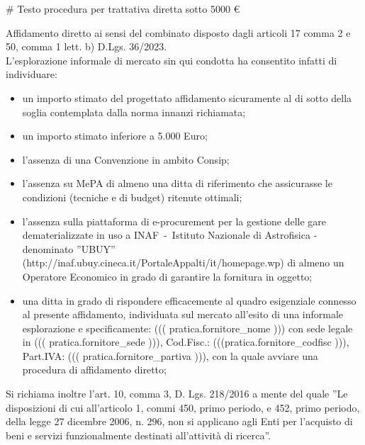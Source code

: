 # Testo procedura per trattativa diretta sotto 5000 €

Affidamento diretto ai sensi del combinato disposto dagli articoli 17 comma 2 e 50, comma 1 lett. b) D.Lgs. 36/2023.\\
L’esplorazione informale di mercato sin qui condotta ha consentito infatti di individuare:
\begin{itemize}
\item un importo stimato del progettato affidamento sicuramente al di sotto della soglia contemplata dalla norma innanzi richiamata;
\item un importo stimato inferiore a 5.000 Euro;
\item l’assenza di una Convenzione in ambito Consip;
\item l'assenza su MePA di almeno una ditta di riferimento che assicurasse le condizioni (tecniche e di budget) ritenute ottimali;
\item l'assenza sulla piattaforma di e-procurement per la gestione delle gare dematerializzate in uso a
	INAF~-~Istituto Nazionale di Astrofisica - denominato ''UBUY''
	(http://inaf.ubuy.cineca.it/PortaleAppalti/it/homepage.wp) di almeno un Operatore Economico in
	grado di garantire la fornitura in oggetto;

\item una ditta in grado di rispondere efficacemente al quadro esigenziale connesso al presente affidamento,
individuata sul mercato all’esito di una informale esplorazione e specificamente:
((( pratica.fornitore_nome ))) con sede legale in ((( pratica.fornitore_sede ))),
Cod.Fisc.: (((pratica.fornitore_codfisc ))), Part.IVA: ((( pratica.fornitore_partiva ))),
con la quale avviare una procedura di affidamento diretto;
\end{itemize}

Si richiama inoltre l’art. 10, comma 3, D. Lgs. 218/2016 a mente
del quale ''Le disposizioni di cui all'articolo 1, commi 450, primo
periodo, e 452, primo periodo, della legge 27 dicembre 2006, n. 296, non
si applicano agli Enti per l'acquisto di beni e servizi funzionalmente
destinati all'attività di ricerca''.



